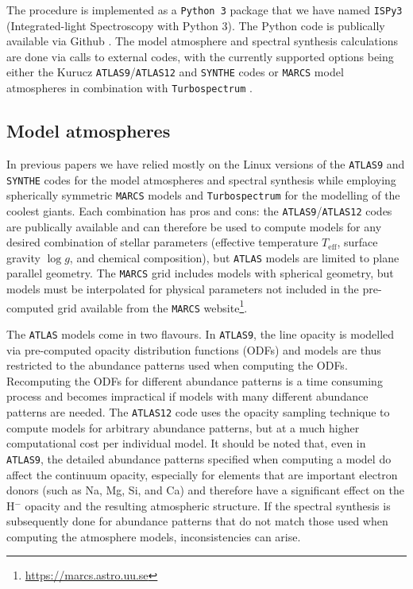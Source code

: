 \documentclass{aa}
\begin{document}
The procedure is implemented as a \texttt{Python 3} package that we have named \texttt{ISPy3} (Integrated-light Spectroscopy with Python 3). The Python code is publically available via Github \citep{ispy3}.
The model atmosphere and spectral synthesis calculations are done via calls to external codes, with the currently supported options being either the Kurucz \texttt{ATLAS9}/\texttt{ATLAS12} and \texttt{SYNTHE} codes  \citep{Kurucz1970,Kurucz1981,Kurucz2005} or \texttt{MARCS} model atmospheres in combination with \texttt{Turbospectrum}  \citep{Gustafsson2008,Alvarez1998,Plez2012}.

\subsection{Model atmospheres}
\label{sec:atmospheres}

In previous papers we have relied mostly on the Linux versions of the \texttt{ATLAS9} and \texttt{SYNTHE} codes \citep{Sbordone2004} for the model atmospheres and spectral synthesis while employing spherically symmetric \texttt{MARCS} models and \texttt{Turbospectrum} \citep{Alvarez1998} for the modelling of the coolest giants. Each combination has pros and cons: the \texttt{ATLAS9}/\texttt{ATLAS12} codes are publically available and can therefore be used to compute models for any desired combination of stellar parameters (effective temperature $T_\mathrm{eff}$, surface gravity $\log g$, and chemical composition), but \texttt{ATLAS} models are limited to plane parallel geometry. The \texttt{MARCS} grid includes models with spherical geometry, but models must be interpolated for physical parameters not included in the pre-computed grid available from the \texttt{MARCS} website\footnote{\url{https://marcs.astro.uu.se}}.

The \texttt{ATLAS} models come in two flavours.
In \texttt{ATLAS9}, the line opacity is modelled via pre-computed opacity distribution functions (ODFs) and models are thus restricted to the abundance patterns used when computing the ODFs. Recomputing the ODFs for different abundance patterns is a time consuming process and becomes impractical if models with many different abundance patterns are needed. The \texttt{ATLAS12} code uses the opacity sampling technique to compute models for arbitrary abundance patterns, but at a much higher computational cost per individual model. It should be noted that, even in \texttt{ATLAS9}, the detailed abundance patterns specified when computing a model do affect the continuum opacity, especially for elements that are important electron donors (such as Na, Mg, Si, and Ca) and therefore have a significant effect on the H$^{-}$ opacity and the resulting atmospheric structure. If the spectral synthesis is subsequently done for abundance patterns that do not match those used when computing the atmosphere models, inconsistencies can arise.
\end{document}
